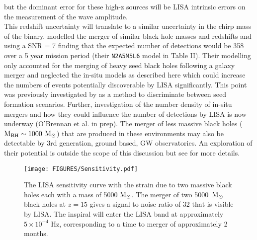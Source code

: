 \documentclass[twocolumn,iop,revtex4]{openjournal}
\newcommand{\msolar} {$\rm{M_{\odot}}~$}
\newcommand{\msolarc} {$\rm{M_{\odot}}$}
\begin{document}
but the dominant error for these high-z sources will be LISA intrinsic errors on the measurement of
the wave amplitude. \\
\indent This redshift uncertainty will translate to a similar uncertainty in the chirp mass of the binary.
\cite{Klein_2016} modelled the merger of similar black hole masses and redshifts and using a
SNR = 7 finding that the expected number of detections would be 358 over a 5 year mission period
(their \texttt{N2A5M5L6} model in Table II). Their modelling only accounted for the merging of
heavy seed black holes following a galaxy merger and
neglected the in-situ models as described here which could increase the numbers of events potentially
discoverable by LISA significantly. This point was previously investigated by
\cite{Hartwig_2018} as a method to discriminate between seed formation scenarios. Further,
investigation of the number density of in-situ mergers and how they could influence the number
of detections by LISA is now underway (O'Brennan et al. in prep). The merger of less
  massive black holes ($\rm{M_{BH} \sim 1000}$ \msolarc) that are produced in these environments
  may also be detectable by 3rd generation, ground based, GW observatories. An exploration of their
  potential is outside the scope of this discussion but see \cite{Valiante_2020} for more details.
\begin{figure}
   \centering 
\texttt{[image: FIGURES/Sensitivity.pdf]}
\caption{The LISA sensitivity curve with the strain due to two massive black holes each with a mass
  of 5000 \msolarc. The merger of two 5000~\msolar black holes at $z = 15$ gives a
  signal to noise ratio of 32 that is visible by LISA. The inspiral will enter the LISA band at
  approximately $5 \times 10^{-4}$ Hz, corresponding to a time to merger of approximately 2 months.}
\label{Fig:Sensitivity}
\end{figure}
\end{document}
